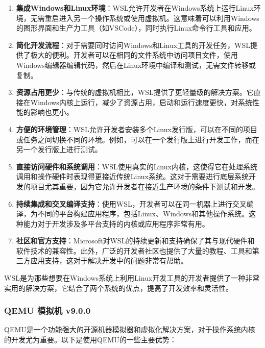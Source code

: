 \begin{enumerate}
    \item \textbf{集成Windows和Linux环境}：WSL允许开发者在Windows系统上运行Linux环境，无需重启进入另一个操作系统或使用虚拟机。这意味着可以利用Windows的图形界面和生产力工具（如VSCode），同时执行Linux命令行工具和应用。
    \item \textbf{简化开发流程}：对于需要同时访问Windows和Linux工具的开发任务，WSL提供了极大的便利。开发者可以在相同的文件系统中访问项目文件，使用Windows编辑器编辑代码，然后在Linux环境中编译和测试，无需文件转移或复制。
    \item \textbf{资源占用更少}：与传统的虚拟机相比，WSL提供了更轻量级的解决方案。它直接在Windows内核上运行，减少了资源占用，启动和运行速度更快，对系统性能的影响也更小。
    \item \textbf{方便的环境管理}：WSL允许开发者安装多个Linux发行版，可以在不同的项目或任务之间切换不同的环境。例如，可以在一个发行版上进行开发工作，而在另一个发行版上进行测试。
    \item \textbf{直接访问硬件和系统调用}：WSL使用真实的Linux内核，这使得它在处理系统调用和操作硬件时表现得更接近传统Linux系统。这对于需要进行底层系统开发的项目尤其重要，因为它允许开发者在接近生产环境的条件下测试和开发。
    \item \textbf{持续集成和交叉编译支持}：使用WSL，开发者可以在同一机器上进行交叉编译，为不同的平台构建应用程序，包括Linux、Windows和其他操作系统。这种能力对于开发涉及多平台支持的内核或应用程序非常有用。
    \item \textbf{社区和官方支持}：Microsoft对WSL的持续更新和支持确保了其与现代硬件和软件技术的兼容性。此外，广泛的开发者社区也提供了大量的教程、工具和第三方应用支持，这对于解决开发中的问题非常有帮助。
\end{enumerate}

WSL是为那些想要在Windows系统上利用Linux开发工具的开发者提供了一种非常实用的解决方案，它结合了两个系统的优点，提高了开发效率和灵活性。

\subsubsection{QEMU 模拟机 v9.0.0}

QEMU是一个功能强大的开源机器模拟器和虚拟化解决方案，对于操作系统内核的开发尤为重要。以下是使用QEMU的一些主要优势：

